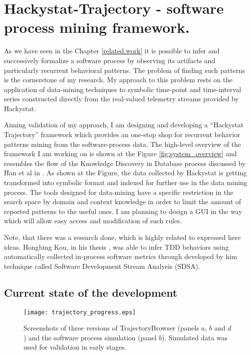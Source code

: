 \chapter{Hackystat-Trajectory - software process mining framework.} \label{trajectory}
As we have seen in the Chapter \ref{related.work} it is possible to infer and successively formalize a software process by observing its artifacts and particularly recurrent behavioral patterns. The problem of finding such patterns is the cornerstone of my research. My approach to this problem rests on the application of data-mining techniques to symbolic time-point and time-interval series constructed directly from the real-valued telemetry streams provided by Hackystat.

Aiming validation of my approach, I am designing and developing a ``Hackystat Trajectory'' framework which provides an one-stop shop for recurrent behavior patterns mining from the software-process data. The high-level overview of the framework I am working on is shown at the Figure \ref{fig:system_overview} and resembles the flow of the Knowledge Discovery in Database process discussed by Han et al in \cite{citeulike:709476}. As shown at the Figure, the data collected by Hackystat is getting transformed into symbolic format and indexed for further use in the data mining process. The tools designed for data-mining have a specific restriction in the search space by domain and context knowledge in order to limit the amount of reported patterns to the useful ones. I am planning to design a GUI in the way which will allow easy access and modification of such rules. 

Note, that there was a research done, which is highly related to expressed here ideas. Hongbing Kou, in his thesis \cite{citeulike:2703162}, was able to infer TDD behaviors using automatically collected in-process software metrics through developed by him technique called Software Development Stream Analysis (SDSA).

\section{Current state of the development}

\begin{figure}[tbp]
   \centering
   \texttt{[image: trajectory\_progress.eps]}
   \caption{Screenshots of three versions of TrajectoryBrowser (panels $a$, $b$ and $d$) and the software process simulation (panel $b$). Simulated data was used for validation in early stages.}
   \label{fig:trajectory_progress}
\end{figure}

